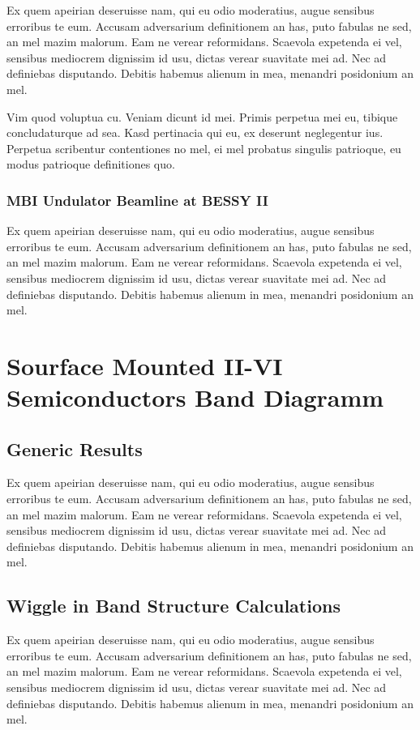 \documentclass[12pt,oneside,english]{book}
\begin{document}
Ex quem apeirian deseruisse nam, qui eu odio moderatius, augue sensibus erroribus te eum. Accusam adversarium definitionem an has, puto fabulas ne sed, an mel mazim malorum. Eam ne verear reformidans. Scaevola expetenda ei vel, sensibus mediocrem dignissim id usu, dictas verear suavitate mei ad. Nec ad definiebas disputando. Debitis habemus alienum in mea, menandri posidonium an mel.

Vim quod voluptua cu. Veniam dicunt id mei. Primis perpetua mei eu, tibique concludaturque ad sea. Kasd pertinacia qui eu, ex deserunt neglegentur ius. Perpetua scribentur contentiones no mel, ei mel probatus singulis patrioque, eu modus patrioque definitiones quo.

\subsection{MBI Undulator Beamline at BESSY II}

Ex quem apeirian deseruisse nam, qui eu odio moderatius, augue sensibus erroribus te eum. Accusam adversarium definitionem an has, puto fabulas ne sed, an mel mazim malorum. Eam ne verear reformidans. Scaevola expetenda ei vel, sensibus mediocrem dignissim id usu, dictas verear suavitate mei ad. Nec ad definiebas disputando. Debitis habemus alienum in mea, menandri posidonium an mel.


\chapter{Sourface Mounted II-VI Semiconductors Band Diagramm}
\section{Generic Results}

Ex quem apeirian deseruisse nam, qui eu odio moderatius, augue sensibus erroribus te eum. Accusam adversarium definitionem an has, puto fabulas ne sed, an mel mazim malorum. Eam ne verear reformidans. Scaevola expetenda ei vel, sensibus mediocrem dignissim id usu, dictas verear suavitate mei ad. Nec ad definiebas disputando. Debitis habemus alienum in mea, menandri posidonium an mel.


\section{Wiggle in Band Structure Calculations}

Ex quem apeirian deseruisse nam, qui eu odio moderatius, augue sensibus erroribus te eum. Accusam adversarium definitionem an has, puto fabulas ne sed, an mel mazim malorum. Eam ne verear reformidans. Scaevola expetenda ei vel, sensibus mediocrem dignissim id usu, dictas verear suavitate mei ad. Nec ad definiebas disputando. Debitis habemus alienum in mea, menandri posidonium an mel.
\end{document}
